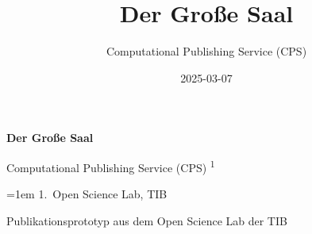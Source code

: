 \documentclass[
  a4paper,
  openany]{book}
\title{Der Große Saal}
\author{Computational Publishing Service (CPS)}
\date{2025-03-07}
\begin{document}
  \begin{frontmatter}
  \begin{titlepage}






  \begin{tcolorbox}


  \centering

  {\headingfont\Huge\bfseries\nohyphens{Der Große
  Saal}}\\[1\baselineskip]

  \end{tcolorbox}

  \bigbreak

  \begin{tcolorbox}
  \centering
      {\centering\large{Computational Publishing Service (CPS)}}%
      {\textsuperscript{1}}%


  \vspace{2\baselineskip} 

  \hangindent=1em
  {1}.~{Open Science Lab, TIB}%


  \vspace{1\baselineskip} 


  \end{tcolorbox}



  \vfill

  \vspace{1\baselineskip} 

  \begin{tcolorbox}
  \centering

  {
    Publikationsprototyp aus dem Open Science Lab der TIB
  }
  \end{tcolorbox}
  \end{titlepage}
  \end{frontmatter}
\end{document}
